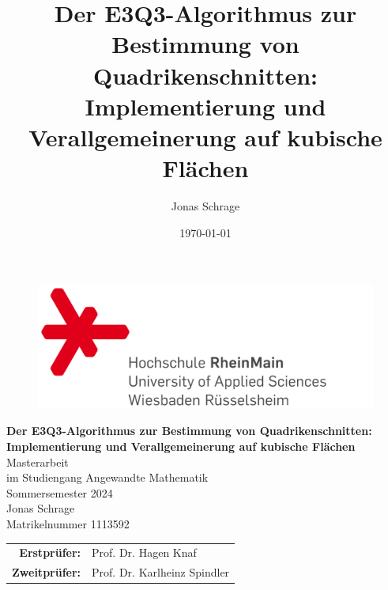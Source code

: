 \documentclass[a4paper,oneside, 11pt, openany%
]{article}
\author{Jonas Schrage}
\title{Der E3Q3-Algorithmus zur Bestimmung von Quadrikenschnitten:
	Implementierung und Verallgemeinerung auf kubische Flächen}
\date{\today}
\theoremstyle{custom}
\theoremstyle{custom}
\begin{document}
	
	\thispagestyle{empty}
		\begin{titlepage}
		\centering
		\begin{figure}[H]
			\centering
			\includegraphics[width=0.8\linewidth]{images/Logo-Hochschule-RheinMain}
			\label{fig:logo-hochschule-rheinmain}
		\end{figure}
		\vspace{1cm}
		\LARGE
		\textbf{Der E3Q3-Algorithmus zur Bestimmung von Quadrikenschnitten:
			Implementierung und Verallgemeinerung auf kubische Flächen}\\
		\vspace{2cm}
		\Large
		Masterarbeit\\
		im Studiengang Angewandte Mathematik\\
		Sommersemester 2024\\
		\vspace{2cm}
		Jonas Schrage\\
		Matrikelnummer 1113592\\
		\vspace{2cm}
		
		\begin{tabular}{rl}
			\textbf{Erstprüfer:}&	Prof. Dr. Hagen Knaf\\
			\textbf{Zweitprüfer:}&	Prof. Dr. Karlheinz Spindler\\
		\end{tabular}
		
		
	\end{titlepage}
	\newpage
\end{document}
